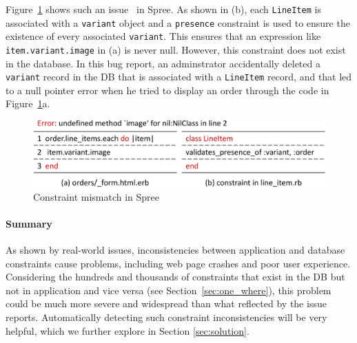 Figure~\ref{fig:spree-3829-different} shows such an issue~\cite{spree-3829} in Spree. As shown in (b), each {\tt LineItem} is associated with a {\tt variant} object and a {\tt presence} constraint is used to ensure the existence of every associated {\tt variant}. This ensures that an expression like
{\tt item.variant.image} in (a) is never null.
However, this constraint does not exist in the database. In this bug report,
an adminstrator accidentally deleted a {\tt variant} record in the DB
that is associated with a {\tt LineItem} record, and that
led to a null pointer error when he tried to display 
an order through the code in Figure~\ref{fig:spree-3829-different}a. 




\begin{figure}
    \centering
    \includegraphics[width=0.6\columnwidth]{constraints/figs/spree-3829-different2.pdf}
    
    \caption{Constraint mismatch in Spree}
    
    \label{fig:spree-3829-different}
\end{figure}



\paragraph{\bf Summary}
As shown by real-world issues, inconsistencies between application 
 and database constraints cause problems, including
web page crashes and poor user experience.
Considering the hundreds and thousands of constraints that exist in the DB
but not in application and vice versa 
(see Section~\ref{sec:one_where}), 
this problem could be much more severe and widespread than
what reflected by the issue reports.
Automatically detecting such constraint inconsistencies will be very helpful, which we further explore in Section \ref{sec:solution}.

